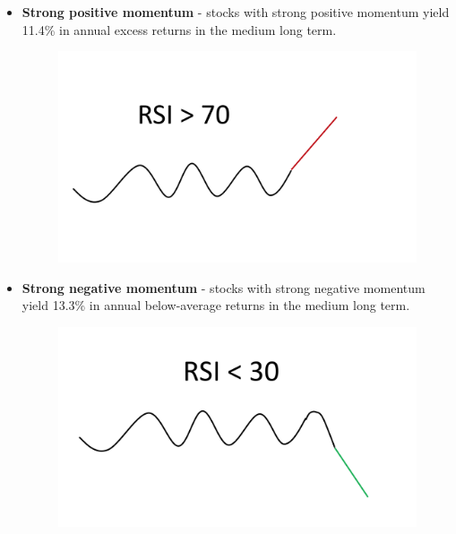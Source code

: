 \begin{itemize}
\begin{figure}[H]
\label{fig:volneg}
\end{figure}
  \item \textbf{Strong positive momentum} - stocks with strong positive momentum yield 11.4\% in annual excess returns in the medium long term.
\begin{figure}[H]
\centering
\includegraphics [scale=0.20,angle=360]{figures/momentumpos.png}
\label{fig:momentumpos}
\end{figure}
  \item \textbf{Strong negative momentum} - stocks with strong negative momentum yield 13.3\% in annual below-average returns in the medium long term. 
\begin{figure}[H]
\centering
\includegraphics [scale=0.20,angle=360]{figures/momneg.png}
\label{fig:momneg}
\end{figure}  
\end{itemize}
\indent \newline 
\cite{investtech}

